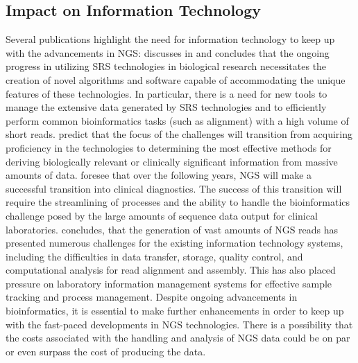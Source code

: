 \subsection{Impact on Information Technology}
Several publications highlight the need for information technology to keep up with the advancements in \ac{NGS}: \citeauthor{Mardis2008b} discusses  \autocite{Mardis2008b} in \citeyear{Mardis2008b} and concludes that the ongoing progress in utilizing \ac{SRS} technologies in biological research necessitates the creation of novel algorithms and software capable of accommodating the unique features of these technologies. In particular, there is a need for new tools to manage the extensive data generated by \ac{SRS} technologies and to efficiently perform common bioinformatics tasks (such as alignment) with a high volume of short reads. \citeauthor{Shendure2008} \autocite{Shendure2008} predict that the focus of the challenges will transition from acquiring proficiency in the technologies to determining the most effective methods for deriving biologically relevant or clinically significant information from massive amounts of data. \citeauthor{voelkerding2009} \autocite{voelkerding2009} foresee that over the following years, \ac{NGS} will make a successful transition into clinical diagnostics. The success of this transition will require the streamlining of processes and the ability to handle the bioinformatics challenge posed by the large amounts of sequence data output for clinical laboratories. \citeauthor{metzker2010} \autocite{metzker2010} concludes, that the generation of vast amounts of \ac{NGS} reads has presented numerous challenges for the existing information technology systems, including the difficulties in data transfer, storage, quality control, and computational analysis for read alignment and assembly. This has also placed pressure on laboratory information management systems for effective sample tracking and process management. Despite ongoing advancements in bioinformatics, it is essential to make further enhancements in order to keep up with the fast-paced developments in \ac{NGS} technologies. There is a possibility that the costs associated with the handling and analysis of NGS data could be on par or even surpass the cost of producing the data.

